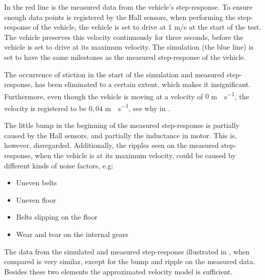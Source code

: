 In  the red line is the measured data from the vehicle's step-response. To ensure enough data points is registered by the Hall sensors, when performing the step-response of the vehicle, the vehicle is set to drive at 1 m/s at the start of the test. The vehicle preserves this velocity continuously for three seconds, before the vehicle is set to drive at its maximum velocity. The simulation (the blue line) is set to have the same milestones as the measured step-response of the vehicle. 

The occurrence of stiction in the start of the simulation and measured step-response, has been eliminated to a certain extent, which makes it insignificant. Furthermore, even though the vehicle is moving at a velocity of $0$ \si{m \cdot s^{-1}}, the velocity is registered to be $0,04$ \si{m \cdot s^{-1}}, see why in . 

The little bump in the beginning of the measured step-response is partially caused by the Hall sensors, and partially the inductance in motor. This is, however, disregarded. Additionally, the ripples seen on the measured step-response, when the vehicle is at its maximum velocity, could be caused by different kinds of noise factors, e.g:

\begin{itemize}
\item Uneven belts
\item Uneven floor
\item Belts slipping on the floor
\item Wear and tear on the internal gears
\end{itemize}

The data from the simulated and measured step-response illustrated in , when compared is very similar, except for the bump and ripple on the measured data. Besides these two elements the approximated velocity model is sufficient.